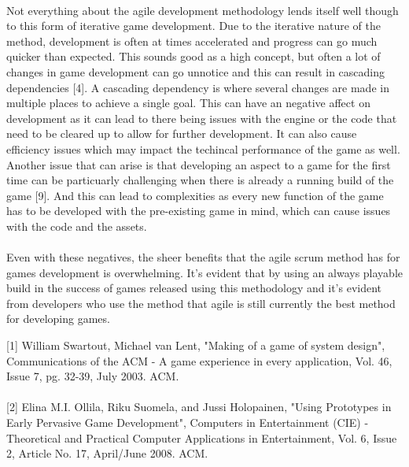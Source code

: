 \documentclass{article}
\begin{document}
\paragraph{}
Not everything about the agile development methodology lends itself well though to this form of iterative game development. Due to the iterative nature of the method, development is often at times accelerated and progress can go much quicker than expected. This sounds good as a high concept, but often a lot of changes in game development can go unnotice and this can result in cascading dependencies [4]. A cascading dependency is where several changes are made in multiple places to achieve a single goal. This can have an negative affect on development as it can lead to there being issues with the engine or the code that need to be cleared up to allow for further development. It can also cause efficiency issues which may impact the techincal performance of the game as well. Another issue that can arise is that developing an aspect to a game for the first time can be particuarly challenging when there is already a running build of the game [9]. And this can lead to complexities as every new function of the game has to be developed with the pre-existing game in mind, which can cause issues with the code and the assets.
\paragraph{}
Even with these negatives, the sheer benefits that the agile scrum method has for games development is overwhelming. It's evident that by using an always playable build in the success of games released using this methodology and it's evident from developers who use the method that agile is still currently the best method for developing games.

\newpage
{}

[1] William Swartout, Michael van Lent, "Making of a game of system design", Communications of the ACM - A game experience in every application, Vol. 46, Issue 7, pg. 32-39, July 2003. ACM.
\paragraph{}
[2] Elina M.I. Ollila, Riku Suomela, and Jussi Holopainen, "Using Prototypes in Early Pervasive Game Development", Computers in Entertainment (CIE) - Theoretical and Practical Computer Applications in Entertainment, Vol. 6, Issue 2, Article No. 17, April/June 2008. ACM.
\end{document}

